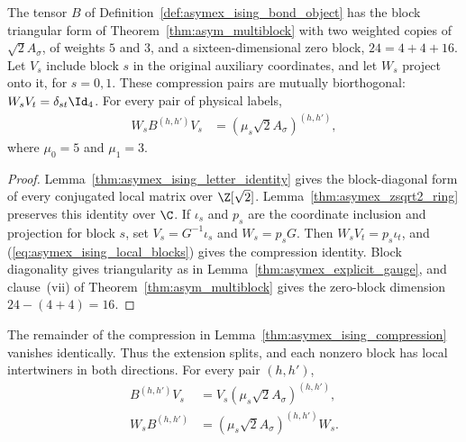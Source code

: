 \begin{lemma}%
    \label{thm:asymex_ising_compression}
    \leanok
    The tensor $B$ of Definition~\ref{def:asymex_ising_bond_object}
    has the block triangular form of Theorem~\ref{thm:asym_multiblock}
    with two weighted copies of $\sqrt2A_\sigma$, of weights $5$ and
    $3$, and a sixteen-dimensional zero block, $24=4+4+16$.
    Let $V_s$ include block $s$ in the original auxiliary coordinates,
    and let $W_s$ project onto it, for $s=0,1$.
    These compression pairs are mutually biorthogonal:
    $W_sV_t=\delta_{st}\Id_4$. For every pair of physical labels,
    \begin{align}
        W_sB^{(h,h')}V_s & =(\mu_s\sqrt2A_\sigma)^{(h,h')},
    \end{align}
    where $\mu_0=5$ and $\mu_1=3$.
\end{lemma}

\begin{proof}
    \leanok
    Lemma~\ref{thm:asymex_ising_letter_identity} gives the block-diagonal
    form of every conjugated local matrix over $\Z[\sqrt2]$.
    Lemma~\ref{thm:asymex_zsqrt2_ring} preserves this identity over
    $\C$. If $\iota_s$ and $p_s$ are the coordinate inclusion and
    projection for block $s$, set $V_s=G^{-1}\iota_s$ and $W_s=p_sG$.
    Then $W_sV_t=p_s\iota_t$, and
    (\ref{eq:asymex_ising_local_blocks}) gives the compression identity.
    Block diagonality gives triangularity as in
    Lemma~\ref{thm:asymex_explicit_gauge}, and clause~(vii) of
    Theorem~\ref{thm:asym_multiblock} gives the zero-block dimension
    $24-(4+4)=16$.
\end{proof}

\begin{lemma}%
    \label{thm:asymex_ising_split}
    \leanok
    The remainder of the compression in
    Lemma~\ref{thm:asymex_ising_compression} vanishes identically.
    Thus the extension splits, and each nonzero block has local
    intertwiners in both directions. For every pair $(h,h')$,
    \begin{align}
        B^{(h,h')}V_s & =V_s(\mu_s\sqrt2A_\sigma)^{(h,h')}, \\
        W_sB^{(h,h')} & =(\mu_s\sqrt2A_\sigma)^{(h,h')}W_s.
    \end{align}
\end{lemma}

